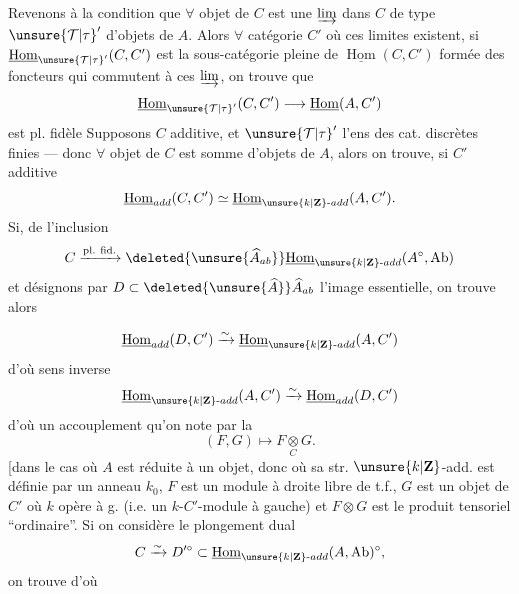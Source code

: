 Revenons à la  condition que
$\forall$ objet de $C$ est une $\varinjlim$ dans $C$
de type $\unsure{\mathcal{T}|\tau}'$ d'objets de $A$. Alors
$\forall$ catégorie $C'$ où ces limites existent,
si $\underline{\operatorname{Hom}}_{\unsure{\mathcal{T}|\tau}'}(C,C')$ est la sous-catégorie
pleine de $\underline{\operatorname{Hom}}(C,C')$ formée des
foncteurs qui commutent à ces
$\varinjlim$, on trouve que
\[
\underline{\operatorname{Hom}}_{\unsure{\mathcal{T}|\tau}'}(C,C')\longrightarrow
\underline{\operatorname{Hom}}(A,C')
\]
est pl. fidèle 
Supposons $C$ additive, et $\unsure{\mathcal{T}|\tau}'$ l'ens
des cat. discrètes finies --- donc
$\forall$ objet de $C$ est somme d'objets
de $A$, alors on trouve, si $C'$ additive
\[
\underline{\operatorname{Hom}}_{add}(C,C')\simeq
\underline{\operatorname{Hom}}_{\unsure{k|\mathbf Z}\text{-}add}(A,C').
\]
Si,  de l'inclusion
\[
C\xrightarrow{\mathrm{pl.\ fid.}}\deleted{\unsure{\widehat A_{ab}}}
\underline{\operatorname{Hom}}_{\unsure{k|\mathbf Z}\text{-}add}(A^\circ,\mathrm{Ab})
\]
et désignons par $D\subset\deleted{\unsure{\widehat A}}\widehat A_{ab}$ l'image
essentielle, on trouve alors

\[
\underline{\operatorname{Hom}}_{add}(D,C')\xrightarrow{\sim}
\underline{\operatorname{Hom}}_{\unsure{k|\mathbf Z}\text{-}add}(A,C')
\]
d'où  sens inverse
\[
\underline{\operatorname{Hom}}_{\unsure{k|\mathbf Z}\text{-}add}(A,C')\xrightarrow{\sim}
\underline{\operatorname{Hom}}_{add}(D,C')
\]
d'où un accouplement
qu'on note par la
\[
(F,G)\longmapsto F\underset{C}{\otimes}G.
\]
[dans le cas où $A$ est réduite à un
objet, donc où sa str. $\unsure{k|\mathbf Z}$-add. est
définie par un anneau $k_0$,
$F$ est un module à droite libre de
t.f., $G$ est un objet de $C'$ où $k$
opère à g. (i.e. un $k$-$C'$-module
à gauche) et $F\otimes G$ est le
produit tensoriel ``ordinaire''.
Si on considère le plongement
dual
\[
C\xrightarrow{\sim}D'^\circ\subset
\underline{\operatorname{Hom}}_{\unsure{k|\mathbf Z}\text{-}add}(A,\mathrm{Ab})^\circ,
\]
on trouve
d'où

